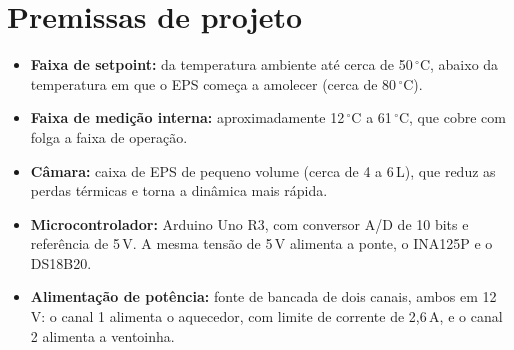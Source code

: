 
\section{Premissas de projeto}

\begin{itemize}
  \item \textbf{Faixa de setpoint:} da temperatura ambiente até cerca de 50\,\ensuremath{^\circ}C, abaixo da temperatura em que o EPS começa a amolecer (cerca de 80\,\ensuremath{^\circ}C).
  \item \textbf{Faixa de medição interna:} aproximadamente 12\,\ensuremath{^\circ}C a 61\,\ensuremath{^\circ}C, que cobre com folga a faixa de operação.
  \item \textbf{Câmara:} caixa de EPS de pequeno volume (cerca de 4 a 6\,L), que reduz as perdas térmicas e torna a dinâmica mais rápida.
  \item \textbf{Microcontrolador:} Arduino Uno R3, com conversor A/D de 10 bits e referência de 5\,V. A mesma tensão de 5\,V alimenta a ponte, o INA125P e o DS18B20.
  \item \textbf{Alimentação de potência:} fonte de bancada de dois canais, ambos em 12\,V: o canal 1 alimenta o aquecedor, com limite de corrente de 2,6\,A, e o canal 2 alimenta a ventoinha.
\end{itemize}

